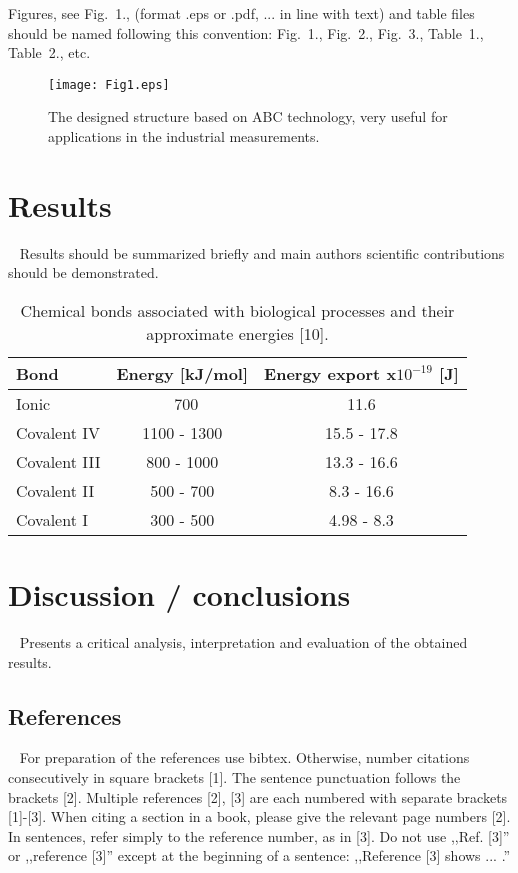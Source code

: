 \documentclass[english]{MSRarticle}
\begin{document}
Figures, see Fig.~1., (format .eps or .pdf, ... in line with text) and table files should be named following this convention: Fig.~1., Fig.~2., Fig.~3., Table~1., Table~2., etc.
	
	
	\begin{figure}[hp]
		\begin{center}
		\texttt{[image: Fig1.eps]}
		\end{center}
		\caption{The designed structure based on ABC technology, very useful for applications in the industrial measurements.}
		\label{fig:Fig1}
	\end{figure}


\section{Results}
\
\indent
Results should be summarized briefly and main authors scientific contributions should be demonstrated.

\medskip

\begin{table}[hp]
\begin{center}
\caption{Chemical bonds associated with biological processes and their approximate energies [10].}
\label{tab:Tab1}
\begin{tabular}{|l|c|c|}
\hline
Bond					&	Energy [kJ/mol]	& Energy export x$10^{-19}$ [J] \\\hline
Ionic					& ~700 						&		11.6 												\\\hline
Covalent IV		& 1100 - 1300			& 15.5 - 17.8										\\\hline
Covalent III	&	800 - 1000			& 13.3 - 16.6										\\\hline
Covalent II		& 500 - 700				& 8.3 - 16.6										\\\hline
Covalent I		& 300 - 500				& 4.98 - 8.3										\\\hline
\end{tabular}
\end{center}
\end{table}
	

\section{Discussion / conclusions}
\
\indent
Presents a critical analysis, interpretation and evaluation of the obtained results.

\subsection{References}
\
\indent
For preparation of the references use bibtex. Otherwise, number citations consecutively in square brackets [1]. The sentence punctuation follows the brackets [2]. Multiple references [2], [3] are each numbered with separate brackets [1]-[3]. When citing a section in a book, please give the relevant page numbers [2]. In sentences, refer simply to the reference number, as in [3]. Do not use ,,Ref. [3]'' or ,,reference [3]'' except at the beginning of a sentence: ,,Reference [3] shows ... .''
\end{document}
